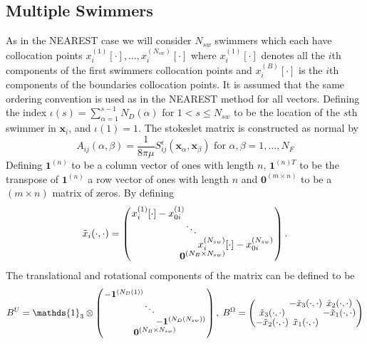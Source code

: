 \subsection{Multiple Swimmers}
As in the NEAREST case we will consider $N_{sw}$ swimmers which each have collocation points $x_i^{(1)}[\cdot],\dots,x_i^{(N_{sw})}[\cdot]$ where $x_i^{(1)}[\cdot]$ denotes all the $i$th components of the first swimmers collocation points and $x_i^{(B)}[\cdot]$ is the $i$th components of the boundaries collocation points. It is assumed that the same ordering convention is used as in the NEAREST method for all vectors.
Defining the index $\iota(s)=\sum_{\alpha=1}^{s-1}N_D(\alpha)$ for $1<s\leq N_{sw}$ to be the location of the $s$th swimmer in $\bm{x}_i$, and $\iota(1)=1$. The stokeslet matrix is constructed as normal by
\begin{equation*}
    A_{ij}(\alpha,\beta) = \frac{1}{8\pi\mu} S_{ij}^\epsilon (\bm{x}_\alpha,\bm{x}_{\beta}) \text { for } \alpha,\beta = 1,\dots,N_F
\end{equation*}
Defining $\bm{1}^{(n)}$ to be a column vector of ones with length $n$, $\bm{1}^{(n)T}$ to be the transpose of $\bm{1}^{(n)}$ a row vector of ones with length $n$ and $\bm{0}^{(m\times n)}$ to be a $(m\times n)$ matrix of zeros. By defining
\begin{equation*}
\arraycolsep=0.4pt\def\arraystretch{0.8}
    \tilde{x}_i(\cdot,\cdot)=\left(\begin{array}{c}
         \begin{array}{ccc}
             x_i^{(1)}[\cdot]-x_{0i}^{(1)} & & \\
              & \ddots & \\
              & & x_i^{(N_{sw})}[\cdot]-x_{0i}^{(N_{sw})}
         \end{array}\\
         \bm{0}^{(N_B \times N_{sw})}
    \end{array}\right).
\end{equation*}
The translational and rotational components of the matrix can be defined to be
\begin{equation*}
\arraycolsep=0.4pt\def\arraystretch{0.8}
    B^U = \mathds{1}_{3} \otimes \left(\begin{array}{c}
         \begin{array}{ccc}
             -\bm{1}^{(N_D(1))} & & \\
              & \ddots & \\
              & & -\bm{1}^{(N_D(N_{sw}))}
         \end{array}\\
         \bm{0}^{(N_B \times N_{sw})}
    \end{array}\right), \;
    B^\Omega =
    \left(\begin{array}{ccc}
             & -\tilde{x}_3(\cdot,\cdot) & \tilde{x}_2(\cdot,\cdot)\\
            \tilde{x}_3(\cdot,\cdot) & & -\tilde{x}_1(\cdot,\cdot)\\
            -\tilde{x}_2(\cdot,\cdot) & \tilde{x}_1(\cdot,\cdot) &
          \end{array}\right)
\end{equation*}
